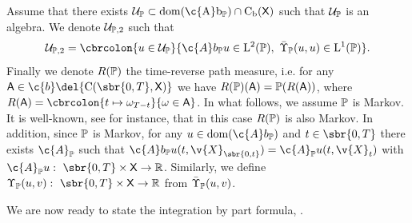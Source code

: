 Assume that there exists $\mathcal{U}_{\bb{P}} \subset \rm{dom}(\c{A}b_{\bb{P}}) \cap \mathrm{C}_b(\sf{X})$ such that $\mathcal{U}_{\bb{P}}$ is an algebra.
We denote $\mathcal{U}_{\bb{P},2}$ such that \begin{equation} \mathcal{U}_{\bb{P},2} = \cbrcolon{u \in \mathcal{U}_{\bb{P}}}{\c{A}b_{\bb{P}} u \in \mathrm{L}^2(\bb{P}), \ \bar{\carrechamp}_{\bb{P}}(u,u) \in \mathrm{L}^1(\bb{P})} .
\end{equation}
Finally we denote $R(\bb{P})$ the time-reverse path measure, i.e. for any $\mathsf{A} \in \c{b}\del{\mathrm{C}(\sbr{0,T}, \sf{X})}$ we have $R(\bb{P})(\mathsf{A}) = \bb{P}(R(\mathsf{A}))$, where $R(\mathsf{A}) = \cbrcolon{t \mapsto \omega_{T-t}}{\omega \in \mathsf{A}}$.
In what follows, we assume $\bb{P}$ is Markov.
It is well-known, see \parencite[Theorem 1.2]{leonard2014reciprocal} for instance, that in this case $R(\bb{P})$ is also Markov.
In addition, since $\bb{P}$ is Markov, for any $u \in \mathrm{dom}(\c{A}b_{\bb{P}})$ and $t \in \sbr{0,T}$ there exists $\c{A}_{\bb{P}}$ such that $\c{A}b_{\bb{P}} u(t, \v{X}_{\sbr{0,t}}) = \c{A}_{\bb{P}} u(t, \v{X}_t)$ with $\c{A}_{\bb{P}} u: \ \sbr{0,T} \times \sf{X} \to \R$.
Similarly, we define $\carrechamp_{\bb{P}}(u,v): \ \sbr{0,T} \times \sf{X} \to \R$ from $\bar{\carrechamp}_{\bb{P}}(u,v)$.

We are now ready to state the integration by part formula, \parencite[Theorem 3.17]{cattiaux2021time}.

